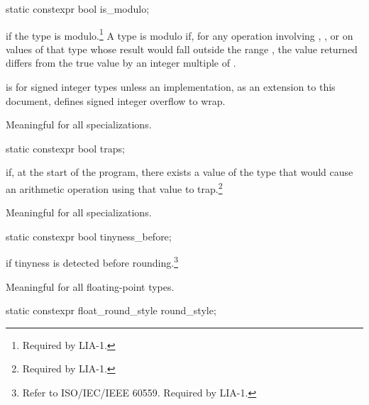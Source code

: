%
\begin{itemdecl}
static constexpr bool is_modulo;
\end{itemdecl}

\begin{itemdescr}
\pnum
{} if the type is modulo.\footnote{Required by LIA-1.}
A type is modulo if, for any operation involving \tcode{+}, \tcode{-}, or
\tcode{*} on values of that type whose result would fall outside the range
, the value returned differs from the true value by an
integer multiple of .

\pnum
\begin{example}
 is  for signed integer types
unless an implementation, as an extension to this document,
defines signed integer overflow to wrap.
\end{example}

\pnum
Meaningful for all specializations.
\end{itemdescr}

%
\begin{itemdecl}
static constexpr bool traps;
\end{itemdecl}

\begin{itemdescr}
\pnum
{}
if, at the start of the program, there exists a value of the type that would cause
an arithmetic operation using that value to trap.\footnote{Required by LIA-1.}

\pnum
Meaningful for all specializations.
\end{itemdescr}

%
\begin{itemdecl}
static constexpr bool tinyness_before;
\end{itemdecl}

\begin{itemdescr}
\pnum
{}
if tinyness is detected before rounding.\footnote{Refer to
ISO/IEC/IEEE 60559.
Required by LIA-1.}

\pnum
Meaningful for all floating-point types.
\end{itemdescr}

%
\begin{itemdecl}
static constexpr float_round_style round_style;
\end{itemdecl}

